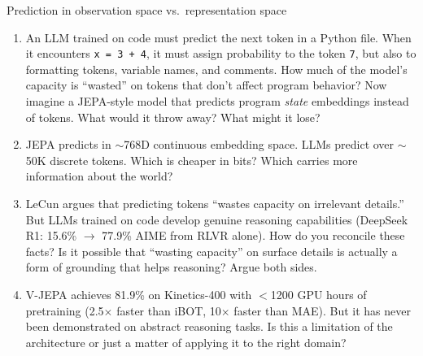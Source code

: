 \begin{thinkfirst}{Prediction in observation space vs.\ representation space}
\begin{enumerate}
  \item An LLM trained on code must predict the next token in a Python file. When it encounters \texttt{x = 3 + 4}, it must assign probability to the token \texttt{7}, but also to formatting tokens, variable names, and comments. How much of the model's capacity is ``wasted'' on tokens that don't affect program behavior? Now imagine a JEPA-style model that predicts program \textit{state} embeddings instead of tokens. What would it throw away? What might it lose?

  \item JEPA predicts in $\sim$768D continuous embedding space. LLMs predict over $\sim$50K discrete tokens. Which is cheaper in bits? Which carries more information about the world?

  \item LeCun argues that predicting tokens ``wastes capacity on irrelevant details.'' But LLMs trained on code develop genuine reasoning capabilities (DeepSeek R1: 15.6\% $\to$ 77.9\% AIME from RLVR alone). How do you reconcile these facts? Is it possible that ``wasting capacity'' on surface details is actually a form of grounding that helps reasoning? Argue both sides.

  \item V-JEPA achieves 81.9\% on Kinetics-400 with $<$1200 GPU hours of pretraining (2.5$\times$ faster than iBOT, 10$\times$ faster than MAE). But it has never been demonstrated on abstract reasoning tasks. Is this a limitation of the architecture or just a matter of applying it to the right domain?
\end{enumerate}
\end{thinkfirst}

